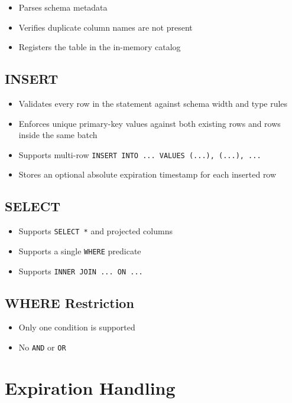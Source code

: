 \documentclass[11pt,a4paper]{article}
\begin{document}
\begin{itemize}
    \item Parses schema metadata
    \item Verifies duplicate column names are not present
    \item Registers the table in the in-memory catalog
\end{itemize}

\subsection{INSERT}

\begin{itemize}
    \item Validates every row in the statement against schema width and type rules
    \item Enforces unique primary-key values against both existing rows and rows inside the same batch
    \item Supports multi-row \texttt{INSERT INTO ... VALUES (...), (...), ...}
    \item Stores an optional absolute expiration timestamp for each inserted row
\end{itemize}

\subsection{SELECT}

\begin{itemize}
    \item Supports \texttt{SELECT *} and projected columns
    \item Supports a single \texttt{WHERE} predicate
    \item Supports \texttt{INNER JOIN ... ON ...}
\end{itemize}

\subsection{WHERE Restriction}

\begin{itemize}
    \item Only one condition is supported
    \item No \texttt{AND} or \texttt{OR}
\end{itemize}

\section{Expiration Handling}
\end{document}
